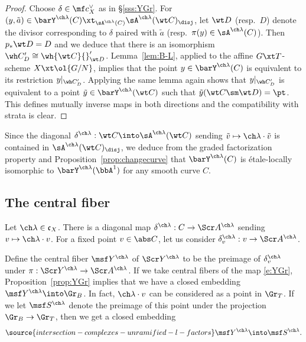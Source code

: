 \begin{proof}
Choose $\delta \in \mf c_X^\vee$ as in \S\ref{sss:YGr}.
For $(y,\tilde a) \in \barY^{\ch\lambda}(C) \xt_{\sA^{\ch\lambda}(C)} \sA^{\ch\lambda}(\wt C)_\disj$, let $\wt D$ (resp.~$D$) denote the divisor corresponding to $\delta$ paired with
$\tilde a$ (resp.~$\pi(y)\in \sA^{\ch\lambda}(C)$).
Then $p_*\wt D = D$ and we deduce that there is an isomorphism
$\wh C'_D \cong \wh{\wt C}{}'_{\wt D}$.
Lemma~\ref{lem:B-L}, applied to
the affine $G\xt T$-scheme $X \xt \ol{G/N}$, implies that the point
$y\in \barY^{\ch\lambda}(C)$ is
equivalent to its restriction $y|_{\wh C'_D}$.
Applying the same lemma again shows that $y|_{\wh C'_D}$ is equivalent to
a point $\tilde y \in \barY^{\ch\lambda}(\wt C)$ such that $\tilde y(\wt C \sm \wt D)=\pt$.
This defines mutually inverse maps in both directions and the compatibility
with strata is clear.
\end{proof}

Since the diagonal $\delta^{\ch\lambda} : \wt C \into \sA^{\ch\lambda}(\wt C)$
sending $\tilde v \mapsto \ch\lambda\cdot \tilde v$ is contained in $\sA^{\ch\lambda}(\wt C)_\disj$, we deduce from the graded factorization property
and Proposition~\ref{prop:changecurve} that $\barY^{\ch\lambda}(C)$
is \'etale-locally isomorphic to $\barY^{\ch\lambda}(\bbA^1)$ for any smooth curve $C$.


\subsection{The central fiber} \label{def:centralfiber}
Let $\ch\lambda \in \mathfrak c_X$. There is a
diagonal map $\delta^{\ch\lambda}:C \to \Scr A^{\ch\lambda}$
sending $v \mapsto \ch\lambda \cdot v$. For a fixed point
$v\in \abs C$, let us consider
$\delta^{\ch\lambda}_v : v \to \Scr A^{\ch\lambda}$.



Define the central fiber $\msf Y^{\ch\lambda}$ of $\Scr Y^{\ch\lambda}$
to be the
preimage of $\delta^{\ch\lambda}_v$ under
$\pi : \Scr Y^{\ch\lambda} \to \Scr A^{\ch\lambda}$.
If we take central fibers of the map \eqref{e:YGr}, Proposition~\ref{prop:YGr} implies that we have a closed embedding
$\msf Y^{\ch\lambda} \into \Gr_B$.
In fact, $\ch\lambda \cdot v$ can be considered as a point in
$\Gr_T$. If we let $\msf S^{\ch\lambda}$ denote the preimage of this point
under the projection $\Gr_B \to \Gr_T$, then we get a closed embedding
\begin{equation} \label{e:YembedGr}
\source{intersection-complexes-unramified-l-factors}
    \msf Y^{\ch\lambda} \into \msf S^{\ch\lambda}.
\end{equation}


